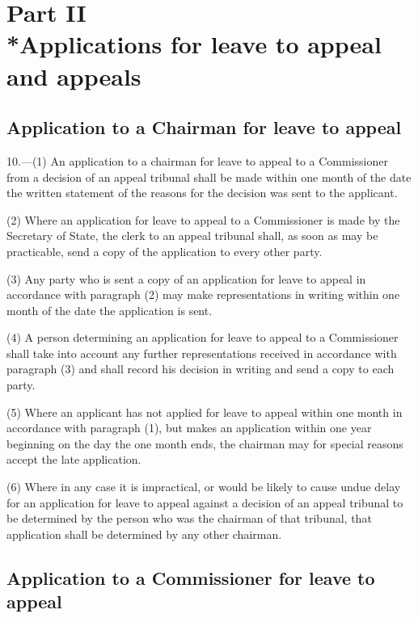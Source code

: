 \documentclass[12pt,a4paper]{article}
\begin{document}
\section[Part II --- Applications for leave to appeal and appeals]{Part II\\*Applications for leave to appeal and appeals}

\subsection[10. Application to a Chairman for leave to appeal]{Application to a Chairman for leave to appeal}

\renewcommand\parthead{--- Part II}

10.—(1) An application to a chairman for leave to appeal to a Commissioner from a decision of an appeal tribunal shall be made within one month of the date the written statement of the reasons for the decision was sent to the applicant.

(2) Where an application for leave to appeal to a Commissioner is made by the Secretary of State, the clerk to an appeal tribunal shall, as soon as may be practicable, send a copy of the application to every other party.

(3) Any party who is sent a copy of an application for leave to appeal in accordance with paragraph (2) may make representations in writing within one month of the date the application is sent.

(4) A person determining an application for leave to appeal to a Commissioner shall take into account any further representations received in accordance with paragraph (3) and shall record his decision in writing and send a copy to each party.

(5) Where an applicant has not applied for leave to appeal within one month in accordance with paragraph (1), but makes an application within one year beginning on the day the one month ends, the chairman may for special reasons accept the late application.

(6) Where in any case it is impractical, or would be likely to cause undue delay for an application for leave to appeal against a decision of an appeal tribunal to be determined by the person who was the chairman of that tribunal, that application shall be determined by any other chairman.

\subsection[11. Application to a Commissioner for leave to appeal]{Application to a Commissioner for leave to appeal}
\end{document}
